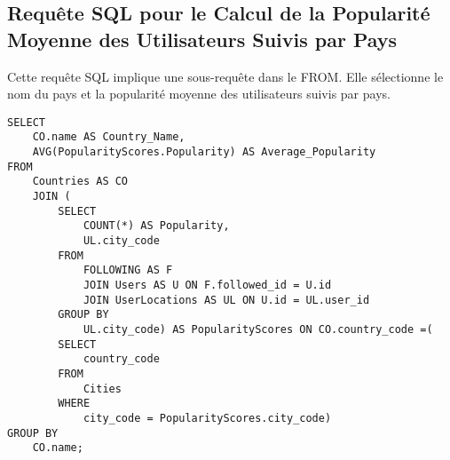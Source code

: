 \subsection{Requête SQL pour le Calcul de la Popularité Moyenne des Utilisateurs Suivis par Pays}

Cette requête SQL implique une sous-requête dans le FROM. Elle sélectionne le nom du pays et la popularité moyenne des utilisateurs suivis par pays.
\begin{lstlisting}
SELECT
    CO.name AS Country_Name,
    AVG(PopularityScores.Popularity) AS Average_Popularity
FROM
    Countries AS CO
    JOIN (
        SELECT
            COUNT(*) AS Popularity,
            UL.city_code
        FROM
            FOLLOWING AS F
            JOIN Users AS U ON F.followed_id = U.id
            JOIN UserLocations AS UL ON U.id = UL.user_id
        GROUP BY
            UL.city_code) AS PopularityScores ON CO.country_code =(
        SELECT
            country_code
        FROM
            Cities
        WHERE
            city_code = PopularityScores.city_code)
GROUP BY
    CO.name;
\end{lstlisting}